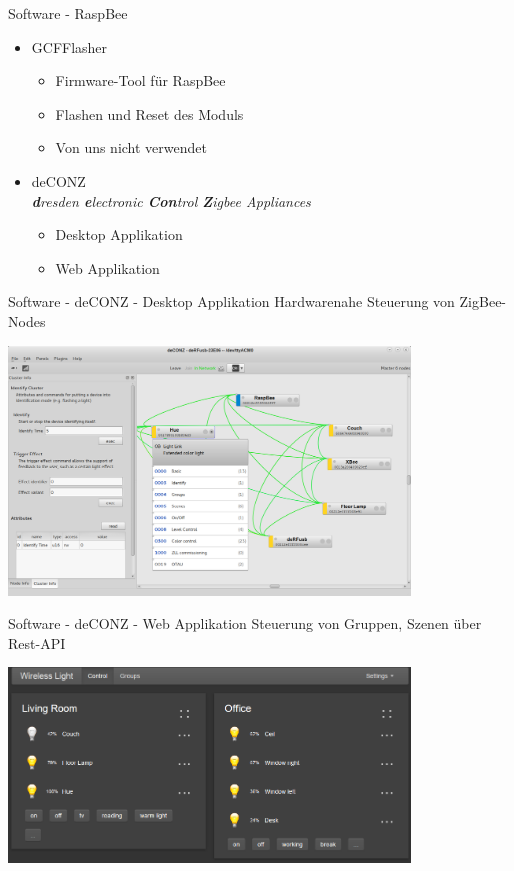 \begin{frame}{Software - RaspBee}
  \Large
  \begin{itemize}
    \item GCFFlasher
    \begin{itemize}
      \Large
      \item Firmware-Tool für RaspBee
      \item Flashen und Reset des Moduls
      \item Von uns nicht verwendet
      \newline
    \end{itemize}
	\item deCONZ\\
      \normalsize{\textit{\textbf dresden \textbf electronic \textbf{Con}trol
        \textbf Zigbee Appliances}}
    \begin{itemize}
      \Large
      \item Desktop Applikation
      \item Web Applikation
    \end{itemize}
  \end{itemize}
\end{frame}

\begin{frame}{Software - deCONZ - Desktop Applikation}
  \Large
  Hardwarenahe Steuerung von ZigBee-Nodes
  \begin{center}
    \includegraphics[width=0.8\textwidth]{images/deconz_app}
  \end{center}
\end{frame}

\begin{frame}{Software - deCONZ - Web Applikation}
  \Large
  Steuerung von Gruppen, Szenen über Rest-API
  \begin{center}
    \includegraphics[width=0.8\textwidth]{images/deconz_web}
  \end{center}
\end{frame}